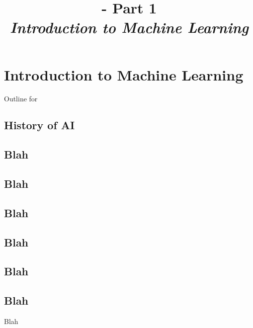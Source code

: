 \renewcommand{\prevpart}{0 }
\renewcommand{\thispart}{1 }
\renewcommand{\nextpart}{2 }

\section{Introduction to Machine Learning}

%
%

\title[\modulename - Part \thispart]
{ 
  {\bf 
   \modulename - 
    Part \thispart\\
  }
  \vspace{0.5cm}
  {\it 
   \color{yellow}
    Introduction to Machine Learning\\
  }
}



\begin{frame}[plain]
  \titlepage
\end{frame}

\begin{frame}{Outline for \secname}
    \tableofcontents[currentsection, hideothersubsections, sectionstyle=show/show]
\end{frame}


\subsection{History of AI}
\subsection{Blah}
\subsection{Blah}
\subsection{Blah}
\subsection{Blah}
\subsection{Blah}
\subsection{Blah}


\begin{frame}{Blah}

\end{frame}

\renewcommand{\partsummarytitle}{Main points to remember }






